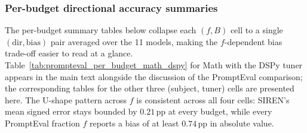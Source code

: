 \subsubsection{Per-budget directional accuracy summaries}
\label{sec:appendix_pe_per_budget}

The per-budget summary tables below collapse each $(f, B)$ cell to a single
$(\mathrm{dir}, \mathrm{bias})$ pair averaged over the 11 models, making the
$f$-dependent bias trade-off easier to read at a glance.
Table~\ref{tab:prompteval_per_budget_math_dspy} for Math with the DSPy
tuner appears in the main text alongside the discussion of the
PromptEval comparison; the corresponding tables for the other three
(subject, tuner) cells are presented here. The U-shape pattern across
$f$ is consistent across all four cells: SIREN's mean signed error
stays bounded by $0.21$\,pp at every budget, while every PromptEval
fraction $f$ reports a bias of at least $0.74$\,pp in absolute value.

\FloatBarrier

\begin{table}[!htbp]
\centering
\caption{PromptEval~\cite{polo2024efficient} per-budget directional accuracy on \textbf{MMLU-Pro Math} for Random Search.}
\label{tab:prompteval_per_budget_math_rs}
\small
\setlength{\tabcolsep}{4pt}
\renewcommand{\arraystretch}{1.0}
\end{table}

